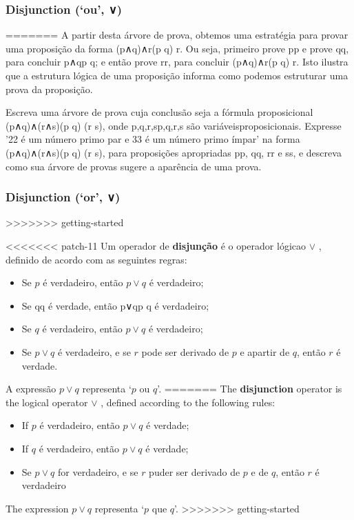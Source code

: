 \begin{itemizar}
\begin{strategy}
\subsubsection*{Disjunction (`ou', ∨\vee)}
=======
A partir desta árvore de prova, obtemos uma estratégia para provar uma proposição da forma (p∧q)∧r(p \wedge q) \wedge r. Ou seja, primeiro prove pp e prove qq, para concluir p∧qp \wedge q; e então prove rr, para concluir (p∧q)∧r(p \wedge q) \wedge r. Isto ilustra que a estrutura lógica de uma proposição informa como podemos estruturar uma prova da proposição.

\begin{exercise}
Escreva uma árvore de prova cuja conclusão seja a fórmula proposicional (p∧q)∧(r∧s)(p \wedge q) \wedge (r \wedge s), onde p,q,r,sp,q,r,s são variáveis ​​proposicionais. Expresse '22 é um número primo par e 33 é um número primo ímpar' na forma (p∧q)∧(r∧s)(p \wedge q) \wedge (r \wedge s), para proposições apropriadas pp, qq, rr e ss, e descreva como sua árvore de provas sugere a aparência de uma prova.
\end{exercise}

\subsubsection*{Disjunction (`or', ∨\vee)}
>>>>>>> getting-started

\begin{idefinition}
\label{defDisjunction}
<<<<<<< patch-11
Um operador de \textbf{disjunção} é o operador lógicao $\vee$ , definido de acordo com as seguintes regras:
\begin{itemize}
\item {} Se $p$ é verdadeiro, então $p \vee q$ é verdadeiro;
\item {} Se qq é verdade, então p∨qp \vee q é verdadeiro;
\item {} Se $q$ é verdadeiro, então $p \vee q$ é verdadeiro;
\item \elimrule{\vee} Se $p \vee q$ é verdadeiro, e se $r$ pode ser derivado de $p$ e apartir de $q$, então $r$ é verdade.
\end{itemize}
A expressão $p \vee q$ representa `$p$ ou $q$'.
=======
The \textbf{disjunction} operator is the logical operator $\vee$ , defined according to the following rules:
\begin{itemize}
\item {} If $p$ é verdadeiro, então $p \vee q$ é verdade;
\item {} If $q$ é verdadeiro, então $p \vee q$ é verdade;
\item \elimrule{\vee} Se $p \vee q$ for verdadeiro, e se $r$ puder ser derivado de $p$ e de $q$, então $r$ é verdadeiro
\end{itemize}
The expression $p \vee q$ representa `$p$ que $q$'.
>>>>>>> getting-started
\end{idefinition}


\end{strategy}
\end{itemizar}
